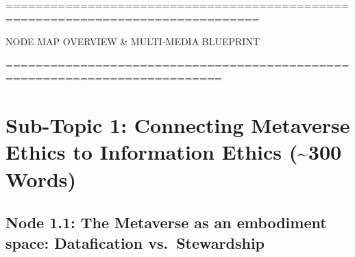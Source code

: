 \documentclass[
  a4paper,
  10pt]{article}
\author{}
\date{}
\renewcommand*\contentsname{Table of contents}
\newcommand\contentsname{Table of contents}
\begin{document}
\renewcommand*\contentsname{Table of contents}
{
\setcounter{tocdepth}{3}
\tableofcontents
}

================================================================================

NODE MAP OVERVIEW \& MULTI-MEDIA BLUEPRINT

===========================================================================

\section{Sub-Topic 1: Connecting Metaverse Ethics to Information Ethics
(\textasciitilde300
Words)}\label{sub-topic-1-connecting-metaverse-ethics-to-information-ethics-300-words}

\subsection{Node 1.1: The Metaverse as an embodiment space: Datafication
vs.~Stewardship}\label{node-1.1-the-metaverse-as-an-embodiment-space-datafication-vs.-stewardship}
\end{document}
